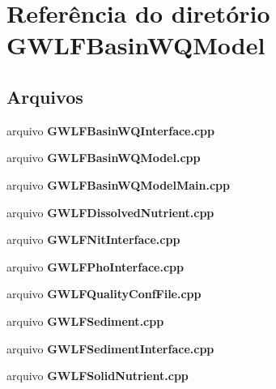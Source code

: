 \section{Referência do diretório G\+W\+L\+F\+Basin\+W\+Q\+Model}
\label{dir_99b1d46c3f7a9ef5ce9887ef3e5abbcd}
\subsection*{Arquivos}
\begin{DoxyCompactItemize}
\item 
arquivo {\bf G\+W\+L\+F\+Basin\+W\+Q\+Interface.\+cpp}
\item 
arquivo {\bf G\+W\+L\+F\+Basin\+W\+Q\+Model.\+cpp}
\item 
arquivo {\bf G\+W\+L\+F\+Basin\+W\+Q\+Model\+Main.\+cpp}
\item 
arquivo {\bf G\+W\+L\+F\+Dissolved\+Nutrient.\+cpp}
\item 
arquivo {\bf G\+W\+L\+F\+Nit\+Interface.\+cpp}
\item 
arquivo {\bf G\+W\+L\+F\+Pho\+Interface.\+cpp}
\item 
arquivo {\bf G\+W\+L\+F\+Quality\+Conf\+File.\+cpp}
\item 
arquivo {\bf G\+W\+L\+F\+Sediment.\+cpp}
\item 
arquivo {\bf G\+W\+L\+F\+Sediment\+Interface.\+cpp}
\item 
arquivo {\bf G\+W\+L\+F\+Solid\+Nutrient.\+cpp}
\end{DoxyCompactItemize}
